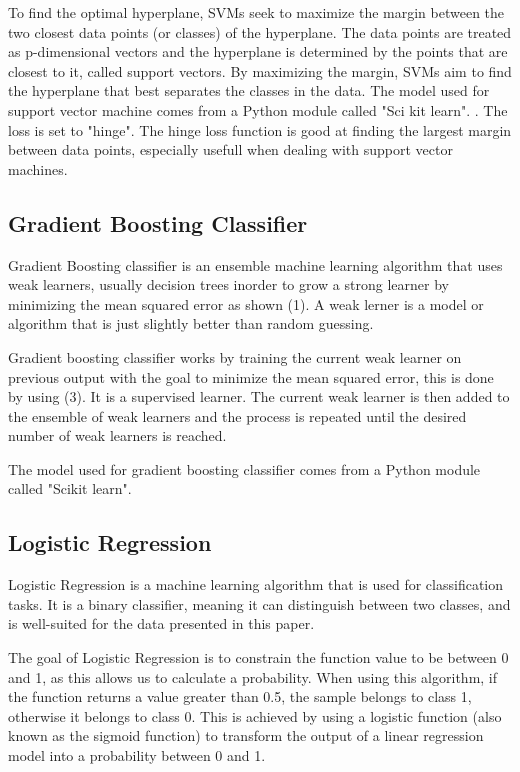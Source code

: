 \documentclass[conference]{IEEEtran}
\begin{document}
To find the optimal hyperplane, SVMs seek to maximize the margin between the two closest data points (or classes) of the hyperplane. The data points are treated as p-dimensional vectors and the hyperplane is determined by the points that are closest to it, called support vectors. By maximizing the margin, SVMs aim to find the hyperplane that best separates the classes in the data.\cite{wikipedia_2022_support_vector_machine}
\newline
\newline
The model used for support vector machine comes from a Python module called "Sci kit learn". \cite{scikit_svm}. The loss is set to "hinge". The hinge loss function is good at finding the largest margin between data points, especially usefull when dealing with support vector machines. \cite{hinge} 

\subsection{Gradient Boosting Classifier}
Gradient Boosting classifier is an ensemble machine learning algorithm that uses weak learners, usually decision trees inorder to grow a strong learner by minimizing the mean squared error as shown (1). A weak lerner is a model or algorithm that is just slightly better than random guessing. \cite{wikipedia_2022_gradient_boosting}\raggedright 
\newline
\newline
Gradient boosting classifier works by training the current weak learner on previous output with the goal to minimize the mean squared error, this is done by using (3). It is a supervised learner. The current weak learner is then added to the ensemble of weak learners and the process is repeated until the desired number of weak learners is reached. 

The model used for gradient boosting classifier comes from a Python module called "Scikit learn". \cite{scikit_gbc} 

\subsection{Logistic Regression}
Logistic Regression is a machine learning algorithm that is used for classification tasks. It is a binary classifier, meaning it can distinguish between two classes, and is well-suited for the data presented in this paper.

The goal of Logistic Regression is to constrain the function value to be between 0 and 1, as this allows us to calculate a probability. When using this algorithm, if the function returns a value greater than 0.5, the sample belongs to class 1, otherwise it belongs to class 0. This is achieved by using a logistic function (also known as the sigmoid function) to transform the output of a linear regression model into a probability between 0 and 1. \cite{albon2018machine} 
\end{document}
